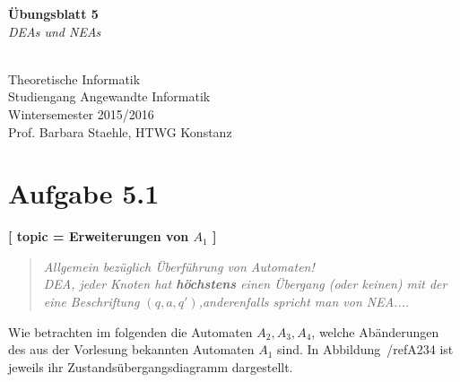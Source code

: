 \documentclass[12pt]{article}
\begin{document}
  
\begin{center}
\begin{huge}
\textbf{Übungsblatt 5}\\
\textit{DEAs und NEAs}
\end{huge} \\

Theoretische Informatik\\
Studiengang Angewandte Informatik\\
Wintersemester 2015/2016\\
Prof. Barbara Staehle, HTWG Konstanz
\end{center}

\section*{Aufgabe 5.1}
\textbf{[ 
 topic = Erweiterungen von $A_1$ 
 ] }
 \begin{quote}
  \textit{Allgemein bezüglich Überführung von Automaten! \\
   DEA, jeder Knoten hat \textbf{höchstens} einen Übergang (oder keinen) mit der eine Beschriftung $(q,a,q')$,anderenfalls spricht man von NEA.... }
  
 \end{quote}
 
 Wie betrachten im folgenden die Automaten $A_2,A_3,A_4$, welche Abänderungen des aus der Vorlesung bekannten Automaten $A_1$ sind. In Abbildung~/ref{A234} ist jeweils ihr Zustandsübergangsdiagramm dargestellt.  
  
\end{document}
